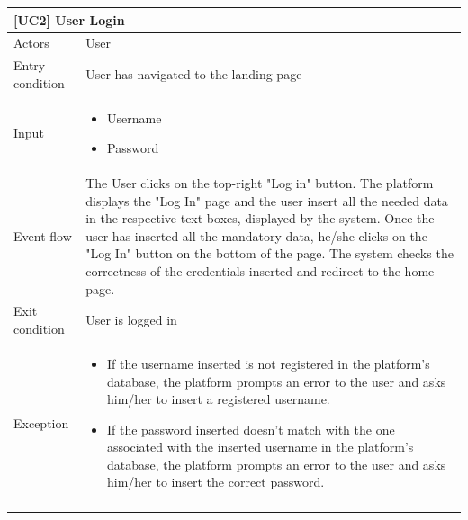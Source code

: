 \documentclass[12pt,oneside,a4paper]{article}
\begin{document}
\begin{table}[htbp]
\begin{tabular}{|l|p{12cm}|}
    \hline
    \multicolumn{2}{|l|}{\textbf{[UC2] User Login}}\\
    \hline
    Actors & User\\
    \hline
    Entry condition & User has navigated to the landing page\\
    \hline
    Input & \begin{itemize}
        \item Username
        \item Password
    \end{itemize}\\
    \hline
    Event flow & The User clicks on the top-right "Log in" button. The platform displays the "Log In" page and the user insert all the needed data in the respective text boxes, displayed by the system. Once the user has inserted all the mandatory data, he/she clicks on the "Log In" button on the bottom of the page.
    The system checks the correctness of the credentials inserted and redirect to the home page.\\
    \hline
    Exit condition & User is logged in\\
    \hline
    Exception & \begin{itemize}
        \item If the username inserted is not registered in the platform's database, the platform prompts an error to the user and asks him/her to insert a registered username.
        \item If the password inserted doesn't match with the one associated with the inserted username in the platform's database, the platform prompts an error to the user and asks him/her to insert the correct password.
    \end{itemize}\\
    \lasthline
\end{tabular}
\end{table}
\end{document}
